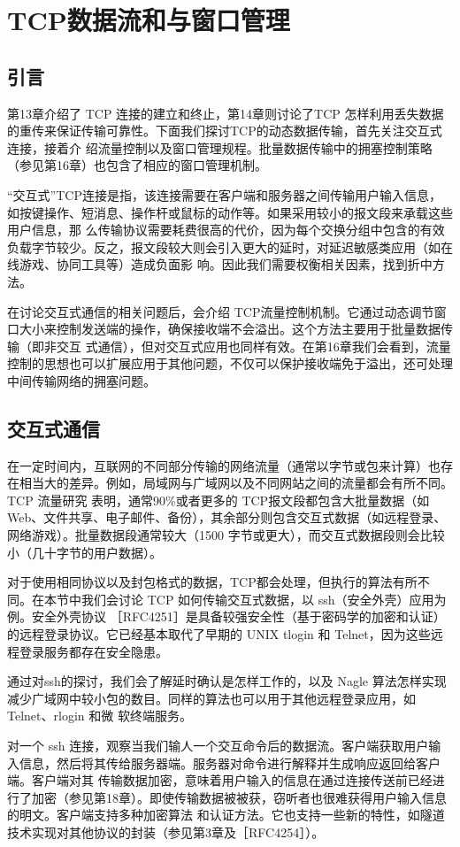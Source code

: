 \chapter{TCP数据流和与窗口管理}
\section{引言}
第13章介绍了 TCP 连接的建立和终止，第14章则讨论了TCP 怎样利用丢失数据的重传来保证传输可靠性。下面我们探讨TCP的动态数据传输，首先关注交互式连接，接着介
绍流量控制以及窗口管理规程。批量数据传输中的拥塞控制策略（参见第16章）也包含了相应的窗口管理机制。

“交互式”TCP连接是指，该连接需要在客户端和服务器之间传输用户输入信息，如按键操作、短消息、操作杆或鼠标的动作等。如果采用较小的报文段来承载这些用户信息，那
么传输协议需要耗费很高的代价，因为每个交换分组中包含的有效负载字节较少。反之，报文段较大则会引入更大的延时，对延迟敏感类应用（如在线游戏、协同工具等）造成负面影
响。因此我们需要权衡相关因素，找到折中方法。

在讨论交互式通信的相关问题后，会介绍 TCP流量控制机制。它通过动态调节窗口大小来控制发送端的操作，确保接收端不会溢出。这个方法主要用于批量数据传输（即非交互
式通信），但对交互式应用也同样有效。在第16章我们会看到，流量控制的思想也可以扩展应用于其他问题，不仅可以保护接收端免于溢出，还可处理中间传输网络的拥塞问题。
\section{交互式通信}

在一定时间内，互联网的不同部分传输的网络流量（通常以字节或包来计算）也存在相当大的差异。例如，局域网与广域网以及不同网站之间的流量都会有所不同。TCP 流量研究
表明，通常90\%或者更多的 TCP报文段都包含大批量数据（如Web、文件共享、电子邮件、备份），其余部分则包含交互式数据（如远程登录、网络游戏）。批量数据段通常较大（1500
字节或更大），而交互式数据段则会比较小（几十字节的用户数据）。

对于使用相同协议以及封包格式的数据，TCP都会处理，但执行的算法有所不同。在本节中我们会讨论 TCP 如何传输交互式数据，以 ssh（安全外壳）应用为例。安全外壳协议
［RFC4251］是具备较强安全性（基于密码学的加密和认证）的远程登录协议。它已经基本取代了早期的 UNIX tlogin 和 Telnet，因为这些远程登录服务都存在安全隐患。

通过对ssh的探讨，我们会了解延时确认是怎样工作的，以及 Nagle 算法怎样实现减少广域网中较小包的数目。同样的算法也可以用于其他远程登录应用，如 Telnet、rlogin 和微
软终端服务。

对一个 ssh 连接，观察当我们输人一个交互命令后的数据流。客户端获取用户输入信息，然后将其传给服务器端。服务器对命令进行解释并生成响应返回给客户端。客户端对其
传输数据加密，意味着用户输入的信息在通过连接传送前已经进行了加密（参见第18章）。即使传输数据被被获，窃听者也很难获得用户输入信息的明文。客户端支持多种加密算法
和认证方法。它也支持一些新的特性，如隧道技术实现对其他协议的封装（参见第3章及［RFC4254］）。

